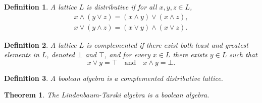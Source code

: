 \documentclass[titlepage]{article}
\newtheorem{theorem}{Theorem}[section]
\newtheorem{definition}{Definition}[section]
\begin{document}
\begin{definition}
    A lattice $L$ is distributive if for all $x,y,z \in L$,
    \begin{align*}
        x \wedge (y \vee z) = (x \wedge y) \vee (x \wedge z), \\
        x \vee (y \wedge z) = (x \vee y) \wedge (x \vee z).
    \end{align*}
\end{definition}

\begin{definition}
    A lattice $L$ is complemented if there exist both least and greatest elements in $L$, denoted $\bot$ and $\top$, and for every $x\in L$ there exists $y\in L$ such that
    $$x \vee y = \top \quad \text{and} \quad x\wedge y = \bot.$$
\end{definition}

\begin{definition}
    A boolean algebra is a complemented distributive lattice.
\end{definition}

\begin{theorem}
    The Lindenbaum-Tarski algebra is a boolean algebra.
\end{theorem}
\end{document}
